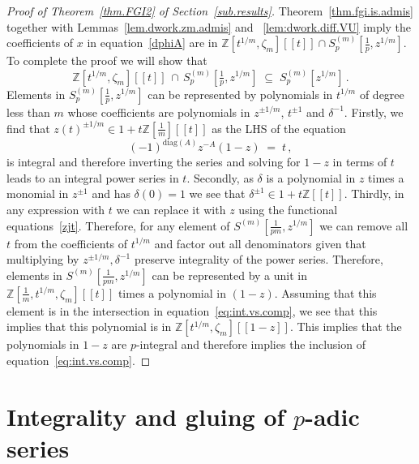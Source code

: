 \documentclass[12pt,reqno]{amsart}
\theoremstyle{definition}
\def\BZ{\mathbb Z}
\def\be{\begin{equation}}
\def\ee{\end{equation}}
\def\z{\zeta}
\def\diag{\mathrm{diag}}
\def\={\;=\;}
\begin{document}


\begin{proof}[Proof of Theorem~\ref{thm.FGI2} of Section~\ref{sub.results}]
Theorem~\ref{thm.fgi.is.admis} together with Lemmas~\ref{lem.dwork.zm.admis} and 
~\ref{lem:dwork.diff.VU} imply the coefficients of $x$ in equation~\eqref{dphiA}
are in $\BZ[t^{1/{m}},\z_{m}][\![t]\!]\cap S^{(m)}_p[\tfrac{1}{p},z^{1/m}]$. To complete
the proof we will show that
\be
\label{eq:int.vs.comp}
\BZ[t^{1/{m}},\z_{m}][\![t]\!]\,\cap\, S^{(m)}_p[\tfrac{1}{p},z^{1/m}]
\;\subseteq\; S^{(m)}_p[z^{1/m}]\,.
\ee
Elements in $S^{(m)}_p[\tfrac{1}{p},z^{1/m}]$ can be represented by polynomials in
$t^{1/{m}}$ of degree less than $m$ whose coefficients are polynomials in
$z^{\pm1/m}$, $t^{\pm1}$ and $\delta^{-1}$. Firstly, we find that
$z(t)^{\pm1/m}\in1+t\BZ[\tfrac{1}{m}][\![t]\!]$ as the LHS of the equation
\be
(-1)^{\diag(A)}z^{-A}(1-z)\=t\,,
\ee
is integral and therefore inverting the series and solving for $1-z$ in terms of
$t$ leads to an integral power series in $t$.
Secondly, as $\delta$ is a polynomial in $z$ times a monomial in $z^{\pm1}$ and has
$\delta(0)=1$ we see that $\delta^{\pm1}\in1+t\BZ[\![t]\!]$.
Thirdly, in any expression with $t$ we can replace it with $z$ using the
functional equations~\eqref{zjt}.
Therefore, for any element of $S^{(m)}[\tfrac{1}{pm},z^{1/m}]$ we can remove all $t$
from the coefficients of $t^{1/m}$ and factor out all denominators given that
multiplying by $z^{\pm1/m},\delta^{-1}$ preserve integrality of the power series.
Therefore, elements in $S^{(m)}[\tfrac{1}{pm},z^{1/m}]$ can be represented by a unit in
$\BZ[\tfrac{1}{m},t^{1/{m}},\z_{m}][\![t]\!]$ times a polynomial in $(1-z)$. Assuming
that this element is in the intersection in equation~\eqref{eq:int.vs.comp}, we see
that this implies that this polynomial is in $\BZ[t^{1/m},\z_{m}][\![1-z]\!]$.
This implies that the polynomials in $1-z$ are $p$-integral and therefore implies
the inclusion of equation~\eqref{eq:int.vs.comp}.
\end{proof}


\section{\texorpdfstring{Integrality and gluing of $p$-adic series}{Integrality
    and gluing of p-adic series}}
\label{sec.modules}
\end{document}
